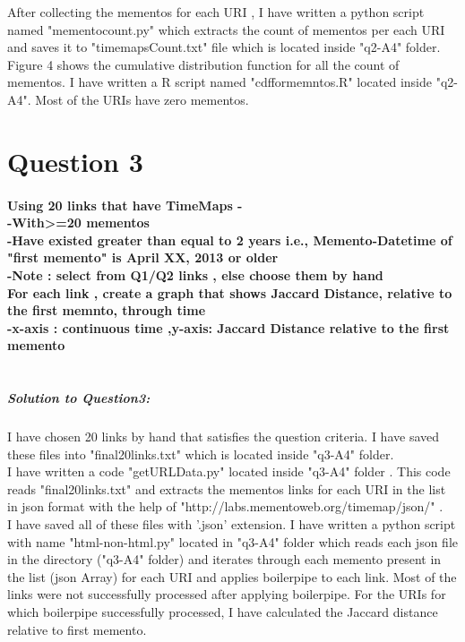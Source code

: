 \documentclass[12pt]{Report}
\begin{document}
After collecting the mementos for each URI , I have written a python script named "mementocount.py" which extracts the count of mementos per each URI and saves it to "timemapsCount.txt" file which is located inside "q2-A4" folder.\\
 

Figure 4 shows the cumulative distribution function for all the count of mementos. I have written a R script named "cdfformemntos.R" located inside "q2-A4".  Most of the URIs have zero mementos. \\


\section{Question 3\\}

\paragraph{Using 20 links that have TimeMaps - \\ -With>=20 mementos\\-Have existed greater than equal to 2 years i.e., Memento-Datetime of "first memento" is April XX, 2013 or older\\ -Note : select from Q1/Q2  links , else choose them by hand \\ For each link , create a graph that shows Jaccard Distance, relative to the first memnto, through time\\-x-axis : continuous time ,y-axis: Jaccard Distance relative to the first memento \\\\ }


\subparagraph{Solution to Question3: \\}

I have chosen 20 links by hand  that satisfies the question criteria. I have saved these files into "final20links.txt" which is located inside "q3-A4" folder.\\
I have written a code "getURLData.py" located inside "q3-A4" folder . This code reads "final20links.txt" and extracts the mementos links for each URI in the list in json format with the help of "http://labs.mementoweb.org/timemap/json/" . \\

I have saved all of these files with '.json' extension.  I have written a python script with name "html-non-html.py" located in "q3-A4" folder which reads each json file in the directory  ("q3-A4" folder) and iterates through each memento present in the  list (json Array)  for each URI and applies boilerpipe to each link.
Most of the links were not successfully processed after applying boilerpipe. For the URIs for which boilerpipe successfully processed, I have calculated the Jaccard distance relative to first memento.\\
\end{document}
